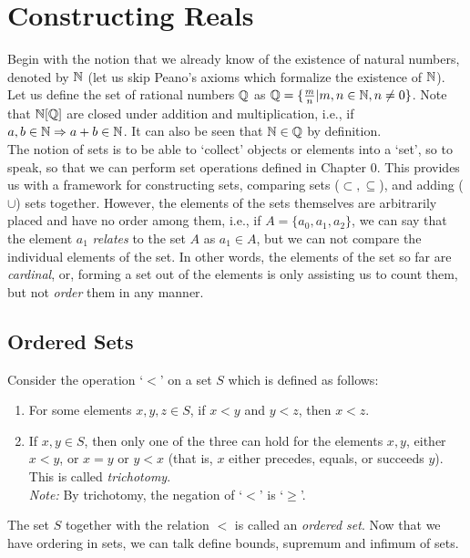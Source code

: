\chapter{Constructing Reals}

Begin with the notion that we already know of the existence of natural numbers, denoted by $\mathbb{N}$ (let us skip Peano's axioms which formalize the existence of $\mathbb{N}$). Let us define the set of rational numbers $\mathbb{Q}$ as $\mathbb{Q}=\{\frac{m}{n}| m,n\in\mathbb{N},n\neq 0\}$. Note that $\mathbb{N}[\mathbb{Q}]$ are closed under addition and multiplication, i.e., if $a,b\in\mathbb{N}\Rightarrow a+b\in \mathbb{N}$. It can also be seen that $\mathbb{N}\in\mathbb{Q}$ by definition.\\

The notion of sets is to be able to `collect' objects or elements into a `set', so to speak, so that we can perform set operations defined in Chapter 0. This provides us with a framework for constructing sets, comparing sets ($\subset, \subseteq$), and adding ($\cup$) sets together. However, the elements of the sets themselves are arbitrarily placed and have no order among them, i.e., if $A=\{a_0,a_1,a_2\}$, we can say that the element $a_1$ \textit{relates} to the set $A$ as $a_1\in A$, but we can not compare the individual elements of the set. In other words, the elements of the set so far are \textit{cardinal}, or, forming a set out of the elements is only assisting us to count them, but not \textit{order} them in any manner.\\

\section{Ordered Sets}

Consider the operation `$<$' on a set $S$ which is defined as follows:
\begin{enumerate}[label=\roman*.]
\item For some elements $x,y,z\in S$, if $x<y$ and $y<z$, then $x<z$.
\item If $x,y\in S$, then only one of the three can hold for the elements $x,y$, either $x<y$, or $x=y$ or $y<x$ (that is, $x$ either precedes, equals, or succeeds $y$).
This is called \textit{trichotomy}.\\
\textit{Note: }By trichotomy, the negation of `$<$' is `$\geq$'.
\end{enumerate}
The set $S$ together with the relation $<$ is called an \textit{ordered set}. Now that we have ordering in sets, we can talk define bounds, supremum and infimum of sets.\\

